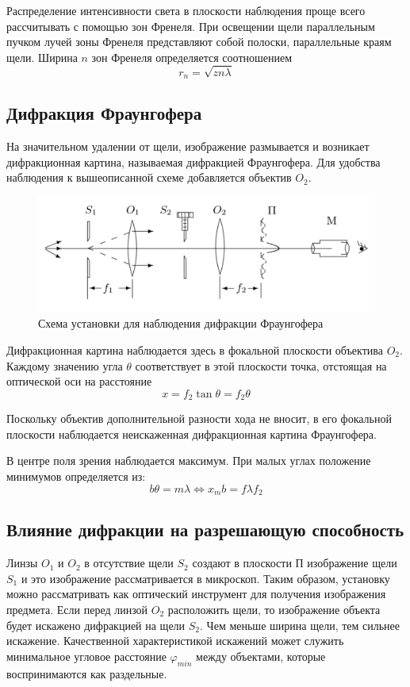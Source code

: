 \documentclass[a4paper,12pt]{article}
\begin{document}
		Распределение интенсивности  света в плоскости наблюдения проще всего рассчитывать с помощью зон Френеля. При освещении щели параллельным пучком лучей зоны Френеля представляют собой полоски, параллельные краям щели. Ширина $n$ зон Френеля определяется соотношением 
		\begin{equation}
			r_n = \sqrt{zn\lambda}
		\end{equation}
	
	\subsection{Дифракция Фраунгофера}
		На значительном удалении от щели, изображение размывается и возникает дифракционная картина, называемая дифракцией Фраунгофера. Для удобства наблюдения к вышеописанной схеме добавляется объектив $O_2$.
		
		\begin{figure}[h!]
			\label{fren}
			\includegraphics[width = 0.7\linewidth]{fraun}
			\centering
			\caption{Схема установки для наблюдения дифракции Фраунгофера}
		\end{figure}
		
		Дифракционная картина наблюдается здесь в фокальной плоскости объектива $O_2$. Каждому значению угла $\theta$ соответствует в этой плоскости точка, отстоящая на оптической оси на расстояние 
		\begin{equation}
			x = f_2\tan\theta = f_2\theta
		\end{equation}
		
		Поскольку объектив дополнительной разности хода не вносит, в его фокальной плоскости наблюдается неискаженная дифракционная картина Фраунгофера.
		
		В центре поля зрения наблюдается максимум. При малых углах положение минимумов определяется из:
		\begin{equation}
			b\theta = m\lambda \Leftrightarrow x_m b = f\lambda f_2
		\end{equation}
		
		\subsection{Влияние дифракции на разрешающую способность}
			Линзы $O_1$ и $O_2$ в отсутствие щели $S_2$ создают в плоскости $\text{П}$ изображение щели $S_1$ и это изображение рассматривается в микроскоп. Таким образом, установку можно рассматривать как оптический инструмент для получения изображения предмета. Если перед линзой $O_2$ расположить щели, то изображение объекта будет искажено дифракцией на щели $S_2$. Чем меньше ширина щели, тем сильнее искажение. Качественной характеристикой искажений может служить минимальное угловое расстояние $\varphi_{min}$ между объектами, которые воспринимаются как раздельные.
		
\end{document}
